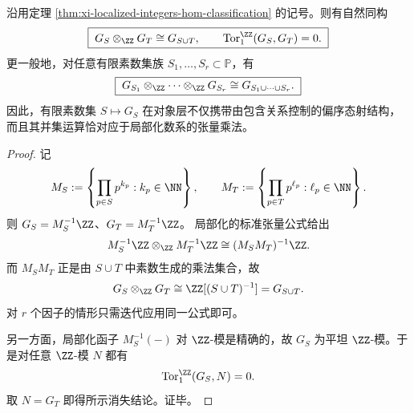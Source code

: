 \begin{theorem}[有限素数局部化数系的张量乘法律]\label{thm:xi-localized-integers-tensor-union-law}
沿用定理 \ref{thm:xi-localized-integers-hom-classification} 的记号。则有自然同构
\[
\boxed{\;
G_S\otimes_{\ZZ}G_T\cong G_{S\cup T},
\qquad
\operatorname{Tor}_1^{\ZZ}(G_S,G_T)=0.\;}
\]
更一般地，对任意有限素数集族 \(S_1,\dots,S_r\subset\mathbb P\)，有
\[
\boxed{\;
G_{S_1}\otimes_{\ZZ}\cdots\otimes_{\ZZ}G_{S_r}
\cong
G_{S_1\cup\cdots\cup S_r}.\;}
\]
因此，有限素数集 \(S\mapsto G_S\) 在对象层不仅携带由包含关系控制的偏序态射结构，而且其并集运算恰对应于局部化数系的张量乘法。
\end{theorem}
\begin{proof}
记
\[
M_S:=\left\{\prod_{p\in S}p^{k_p}:k_p\in\NN\right\},
\qquad
M_T:=\left\{\prod_{p\in T}p^{\ell_p}:\ell_p\in\NN\right\}.
\]
则 \(G_S=M_S^{-1}\ZZ\)、\(G_T=M_T^{-1}\ZZ\)。
局部化的标准张量公式给出
\[
M_S^{-1}\ZZ\otimes_{\ZZ}M_T^{-1}\ZZ
\cong
(M_SM_T)^{-1}\ZZ.
\]
而 \(M_SM_T\) 正是由 \(S\cup T\) 中素数生成的乘法集合，故
\[
G_S\otimes_{\ZZ}G_T\cong \ZZ[(S\cup T)^{-1}]=G_{S\cup T}.
\]
对 \(r\) 个因子的情形只需迭代应用同一公式即可。
\par
另一方面，局部化函子 \(M_S^{-1}(-)\) 对 \(\ZZ\)-模是精确的，故 \(G_S\) 为平坦
\(\ZZ\)-模。于是对任意 \(\ZZ\)-模 \(N\) 都有
\[
\operatorname{Tor}_1^{\ZZ}(G_S,N)=0.
\]
取 \(N=G_T\) 即得所示消失结论。证毕。
\end{proof}

\endinput
